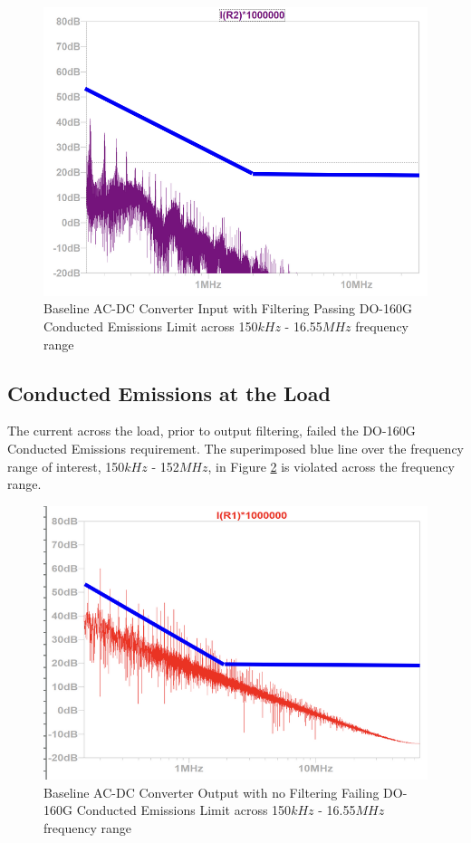 \documentclass[conference]{IEEEtran}
\begin{document}
\begin{figure}[h]
    \centering
    \includegraphics[width=1.0\linewidth]{input_filter_emissions_limit.png}
    \caption{Baseline AC-DC Converter Input with Filtering Passing DO-160G Conducted Emissions Limit across 150$kHz$ - 16.55$MHz$ frequency range}
    \label{fig:input_filter_emissions_limit_waveform}
\end{figure}

\subsection{Conducted Emissions at the Load}
The current across the load, prior to output filtering, failed the DO-160G Conducted Emissions requirement. The superimposed blue line over the frequency range of interest, 150$kHz$ - 152$MHz$, in Figure \ref{fig:no_output_filter_emissions_limit_waveform} is violated across the frequency range.

\begin{figure}[htp]
    \centering
    \includegraphics[width=1.0\linewidth]{no_output_filter_emissions_limit.png}
    \caption{Baseline AC-DC Converter Output with no Filtering Failing DO-160G Conducted Emissions Limit across 150$kHz$ - 16.55$MHz$ frequency range}
    \label{fig:no_output_filter_emissions_limit_waveform}
\end{figure}
\end{document}
